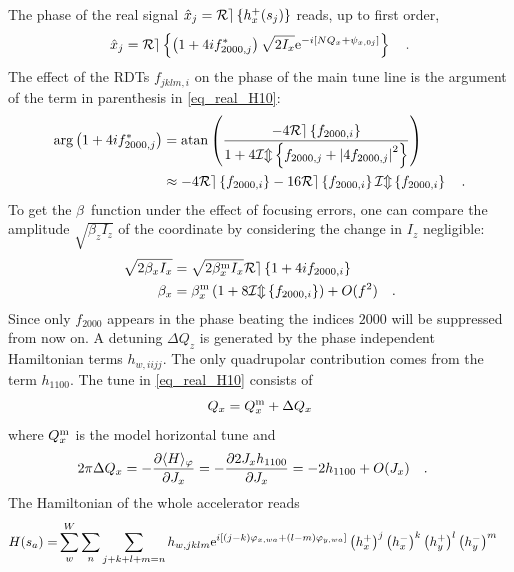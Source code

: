 The phase of the real signal $\hat{x}_j = \mathcal{Re} \left\{ h_x^+(s_j) \right\}$ reads,
up to first order,
%
\begin{equation}
    \hat{x}_j = \mathcal{Re} \left\{ \left( 1+4if_{2000,j}^* \right) \sqrt{2I_x}\text{e}^{-i[ N Q_x+\psi_{x,0j}]} \right\}
  \quad .
  \label{eq_real_H10}
\end{equation}
%
The effect of the RDTs $f_{jklm,i}$ on the phase of the main tune
line is the argument of the term in parenthesis in \eqref{eq_real_H10}:
%
\begin{align}
 \arg\left( 1+4if_{2000,j}^* \right)
  &=   \mathrm{atan} \left(
   \frac{
     -4\mathcal{Re} \left\{  f_{2000,i} \right\}
   }{
     1 +4\mathcal{Im} \left\{ f_{2000,j} + \left| 4 f_{2000,j}\right|^2  \right\}
   } \right) \notag \\
  &\approx  -4 \mathcal{Re} \left\{ f_{2000,i} \right\} - 16 \mathcal{Re} \left\{ f_{2000,i} \right\}\mathcal{Im} \left\{ f_{2000,i} \right\}
 \quad .
\label{eq_thetaH}
\end{align}
%
To get the $\beta$~function under the effect of focusing errors, one can compare the amplitude
$\sqrt{\beta_zI_z}$ of the coordinate by considering the change in $I_z$ negligible:
%
\begin{align}
    \sqrt{2\beta_xI_x} &= \sqrt{2\beta_x^\text{m} I_x}\mathcal{Re} \left\{  1 + 4if_{2000,i} \right\} \notag \\
    \beta_x &= \beta_x^\text{m} \left( 1 + 8\mathcal{Im} \left\{ f_{2000,i} \right\}\right) + O(f^2)
    \quad .
    \label{eq_betabeat}
\end{align}
%
Since only $f_{2000}$ appears in the phase beating the indices $2000$ will be suppressed from now on.
A detuning $\Delta Q_z$ is generated by the phase independent Hamiltonian terms $h_{w, iijj}$.
The only quadrupolar contribution comes from the term
$h_{1100}$.
The tune in \eqref{eq_real_H10} consists of
%
\begin{equation}
  \label{eq_tune_dshift}
  Q_x = Q_{x}^\text{m} + \Delta Q_x
\end{equation}
%
where $Q_{x}^\text{m}$ is the model horizontal tune and
%
\begin{align}
  2\pi\Delta Q_x &= -\frac{\partial \langle H \rangle_\varphi}{\partial J_x}
  = -\frac{\partial 2 J_x
    h_{1100}}{\partial J_x} = -2h_{1100} + O(J_x) 
    \quad . 
  \label{eq_tune_shift_h1100}
\end{align}
%
The Hamiltonian of the whole accelerator reads
%
\begin{align}
  H(s_a) =& \sum\limits_{w}^{W}\sum\limits_{n}\sum\limits_{j+k+l+m=n} h_{w,jklm}
  \text{e}^{i\left[ (j-k)\varphi_{x,wa} + (l-m)\varphi_{y,wa} \right]}
  \left( h_x^+ \right)^j
  \left( h_x^- \right)^k
  \left( h_y^+ \right)^l
  \left( h_y^- \right)^m
  \label{eq_Hamil}
\end{align}
